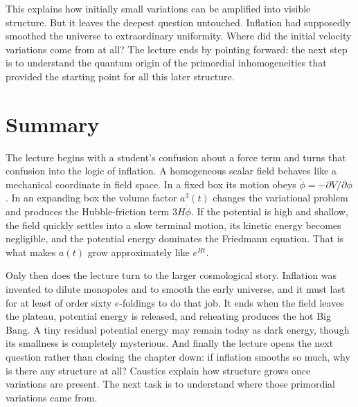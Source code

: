 This explains how initially small variations can be amplified into visible structure. But it leaves the deepest question untouched. Inflation had supposedly smoothed the universe to extraordinary uniformity. Where did the initial velocity variations come from at all? The lecture ends by pointing forward: the next step is to understand the quantum origin of the primordial inhomogeneities that provided the starting point for all this later structure.

\section{Summary}

The lecture begins with a student's confusion about a force term and turns that confusion into the logic of inflation. A homogeneous scalar field behaves like a mechanical coordinate in field space. In a fixed box its motion obeys \(\ddot\phi=-\partial V/\partial\phi\). In an expanding box the volume factor \(a^{3}(t)\) changes the variational problem and produces the Hubble-friction term \(3H\dot\phi\). If the potential is high and shallow, the field quickly settles into a slow terminal motion, its kinetic energy becomes negligible, and the potential energy dominates the Friedmann equation. That is what makes \(a(t)\) grow approximately like \(e^{Ht}\).

Only then does the lecture turn to the larger cosmological story. Inflation was invented to dilute monopoles and to smooth the early universe, and it must last for at least of order sixty \(e\)-foldings to do that job. It ends when the field leaves the plateau, potential energy is released, and reheating produces the hot Big Bang. A tiny residual potential energy may remain today as dark energy, though its smallness is completely mysterious. And finally the lecture opens the next question rather than closing the chapter down: if inflation smooths so much, why is there any structure at all? Caustics explain how structure grows once variations are present. The next task is to understand where those primordial variations came from.